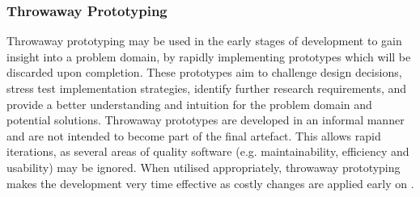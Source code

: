 
\subsubsection{Throwaway Prototyping}
\label{sec:method_throwaway_prototyping}

Throwaway prototyping may be used in the early stages of development to gain insight into a problem domain, by rapidly implementing prototypes which will be discarded upon completion. These prototypes aim to challenge design decisions, stress test implementation strategies, identify further research requirements, and provide a better understanding and intuition for the problem domain and potential solutions. Throwaway prototypes are developed in an informal manner and are not intended to become part of the final artefact. This allows rapid iterations, as several areas of quality software (e.g. maintainability, efficiency and usability) may be ignored. When utilised appropriately, throwaway prototyping makes the development very time effective as costly changes are applied early on \cite{operational_prototyping}.
